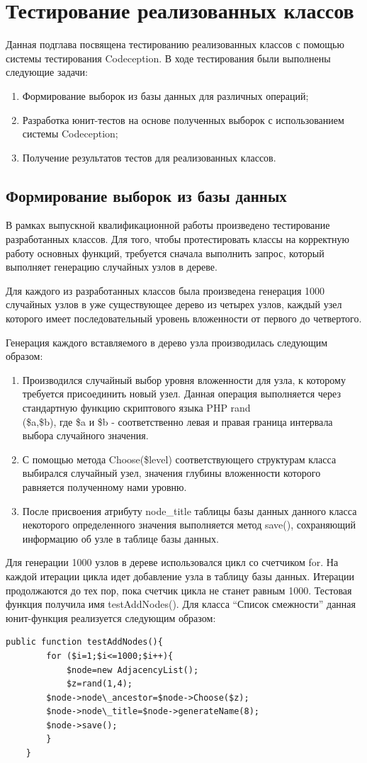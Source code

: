 \documentclass[a4paper,14pt]{extreport}
\theoremstyle{definition}
\begin{document}
\section{Тестирование реализованных классов}
Данная подглава посвящена тестированию реализованных классов с помощью системы тестирования Codeception. В ходе тестирования были выполнены следующие задачи:
\begin{enumerate}
\item Формирование выборок из базы данных для различных операций;
\item Разработка юнит-тестов на основе полученных выборок с использованием системы Codeception;
\item Получение результатов тестов для реализованных классов.
\end{enumerate}
\subsection{Формирование выборок из базы данных}
В рамках выпускной квалификационной работы произведено тестирование разработанных классов. Для того, чтобы протестировать классы на корректную работу основных функций, требуется сначала выполнить запрос, который выполняет генерацию случайных узлов в дереве.

Для каждого из разработанных классов была произведена генерация 1000 случайных узлов в уже существующее дерево из четырех узлов, каждый узел которого имеет последовательный уровень вложенности от первого до четвертого.

Генерация каждого вставляемого в дерево узла производилась следующим образом:
\begin{enumerate}
\item Производился случайный выбор уровня вложенности для узла, к которому требуется присоединить новый узел. Данная операция выполняется через стандартную функцию скриптового языка PHP rand\\(\$a,\$b)\cite{Koterov}, где \$a и \$b - соответственно левая и правая граница интервала выбора случайного значения.
\item С помощью метода Choose(\$level) соответствующего структурам класса выбирался случайный узел, значения глубины вложенности которого равняется полученному нами уровню.
\item После присвоения атрибуту node\_title таблицы базы данных данного класса некоторого определенного значения выполняется метод save(), сохраняющий информацию об узле в таблице базы данных.
\end{enumerate}
Для генерации 1000 узлов в дереве использовался цикл со счетчиком for. На каждой итерации цикла идет добавление узла в таблицу базы данных. Итерации продолжаются до тех пор, пока счетчик цикла не станет равным 1000. Тестовая функция получила имя testAddNodes(). Для класса “Список смежности” данная юнит-функция реализуется следующим образом:
\begin{verbatim}public function testAddNodes(){
        for ($i=1;$i<=1000;$i++){
            $node=new AdjacencyList();
            $z=rand(1,4);
        $node->node\_ancestor=$node->Choose($z);
        $node->node\_title=$node->generateName(8);
        $node->save();
        }
    }\end{verbatim}
\end{document}
